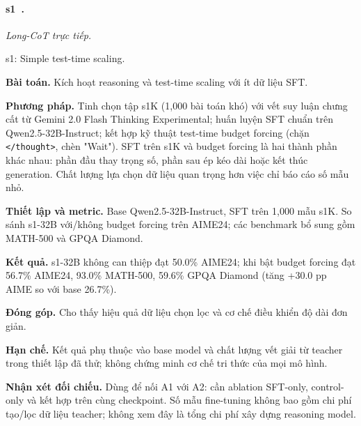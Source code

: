 \begin{samepage}
\paragraph{s1~\cite{rra1_s1}.}
\emph{Long-CoT trực tiếp.}\par
{\raggedright\noindent\small s1: Simple test-time scaling.\par}
\noindent\textbf{Bài toán.} Kích hoạt reasoning và test-time scaling với ít dữ liệu SFT.\par
\end{samepage}
\noindent\textbf{Phương pháp.} Tinh chọn tập s1K (1,000 bài toán khó) với vết suy luận chưng cất từ Gemini 2.0 Flash Thinking Experimental; huấn luyện SFT chuẩn trên Qwen2.5-32B-Instruct; kết hợp kỹ thuật test-time budget forcing (chặn \texttt{</thought>}, chèn "Wait"). SFT trên s1K và budget forcing là hai thành phần khác nhau: phần đầu thay trọng số, phần sau ép kéo dài hoặc kết thúc generation. Chất lượng lựa chọn dữ liệu quan trọng hơn việc chỉ báo cáo số mẫu nhỏ.\par
\noindent\textbf{Thiết lập và metric.} Base Qwen2.5-32B-Instruct, SFT trên 1,000 mẫu s1K. So sánh s1-32B với/không budget forcing trên AIME24; các benchmark bổ sung gồm MATH-500 và GPQA Diamond.\par
\noindent\textbf{Kết quả.} s1-32B không can thiệp đạt 50.0\% AIME24; khi bật budget forcing đạt 56.7\% AIME24, 93.0\% MATH-500, 59.6\% GPQA Diamond (tăng +30.0 pp AIME so với base 26.7\%).\par
\noindent\textbf{Đóng góp.} Cho thấy hiệu quả dữ liệu chọn lọc và cơ chế điều khiển độ dài đơn giản.\par
\noindent\textbf{Hạn chế.} Kết quả phụ thuộc vào base model và chất lượng vết giải từ teacher trong thiết lập đã thử; không chứng minh cơ chế tri thức của mọi mô hình.\par
\begin{samepage}
\noindent\textbf{Nhận xét đối chiếu.} Dùng để nối A1 với A2: cần ablation SFT-only, control-only và kết hợp trên cùng checkpoint. Số mẫu fine-tuning không bao gồm chi phí tạo/lọc dữ liệu teacher; không xem đây là tổng chi phí xây dựng reasoning model.\par
{}
\end{samepage}

